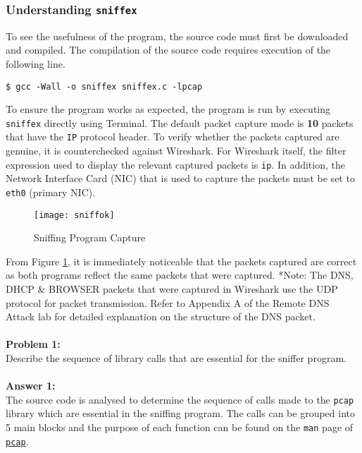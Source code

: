 \documentclass[a4paper,12pt]{article}
\begin{document}
\subsubsection{Understanding \texttt{sniffex}}
To see the usefulness of the program, the source code must first be downloaded and compiled. The compilation of the source code requires execution of the following line.
\begin{verbatim}
$ gcc -Wall -o sniffex sniffex.c -lpcap
\end{verbatim}
To ensure the program works as expected, the program is run by executing \texttt{sniffex} directly using Terminal. The default packet capture mode is \textbf{10} packets that have the \texttt{IP} protocol header. To verify whether the packets captured are genuine, it is counterchecked against Wireshark. For Wireshark itself, the filter expression used to display the relevant captured packets is \texttt{ip}. In addition, the Network Interface Card (NIC) that is used to capture the packets must be set to \texttt{eth0} (primary NIC).

\begin{figure}[H]
\centering
\texttt{[image: sniffok]}
\caption{Sniffing Program Capture}
\label{fig:sniffok}
\end{figure}

\noindent From Figure \ref{fig:sniffok}, it is immediately noticeable that the packets captured are correct as both programs reflect the same packets that were captured. *Note: The DNS, DHCP \& BROWSER packets that were captured in Wireshark use the UDP protocol for packet transmission. Refer to Appendix A of the Remote DNS Attack lab for detailed explanation on the structure of the DNS packet.\\\\
\noindent
\textbf{Problem 1:}\\ Describe the sequence of library calls that are essential for the sniffer program.\\\\
\textbf{Answer 1:}\\
The source code is analysed to determine the sequence of calls made to the \texttt{pcap} library which are essential in the sniffing program. The calls can be grouped into 5 main blocks and the purpose of each function can be found on the \texttt{man} page of \href{http://www.tcpdump.org/manpages/pcap.3pcap.html}{\texttt{pcap}}.
\end{document}
